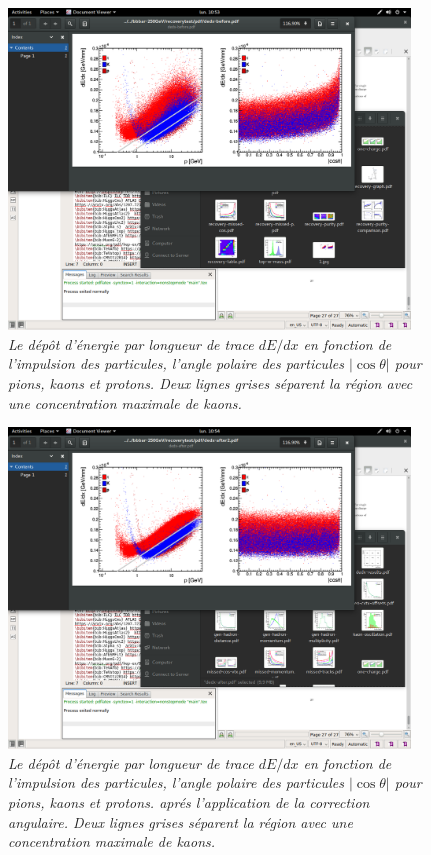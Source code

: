 \begin{figure}
	{\centering
		\includegraphics[clip, trim=8cm 18.5cm 7cm 4cm,width=0.95\textwidth]{ILD/plots/dedx-before.png}
		\caption{\sl Le dépôt d'énergie par longueur de trace $dE/dx$ en fonction de l'impulsion des particules, l'angle polaire des particules $|\cos\theta|$ pour pions, kaons et protons. Deux lignes grises séparent la région avec une concentration maximale de kaons.
		}
		\label{fig:dEdxBefore_3F}
	}
\end{figure}

\begin{figure}
	{\centering
		\includegraphics[clip, trim=8cm 18.5cm 7cm 4cm, width=0.95\textwidth]{ILD/plots/dedx-after.png}
		\caption{\sl Le dépôt d'énergie par longueur de trace $dE/dx$ en fonction de l'impulsion des particules, l'angle polaire des particules $|\cos\theta|$ pour pions, kaons et protons. apr\'es l'application de la correction angulaire.  Deux lignes grises séparent la région avec une concentration maximale de kaons.
		}
		\label{fig:dEdxAfter_3F}
	}
\end{figure}



